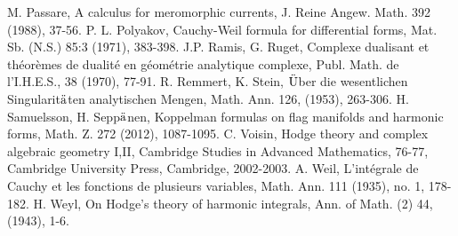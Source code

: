 \documentclass[11pt,reqno]{amsart}
\numberwithin{equation}{section}
\begin{document}
\begin{thebibliography}{WIDT}
 M. Passare, A calculus for meromorphic currents, J. Reine Angew. Math.
392 (1988), 37-56. 
 P. L. Polyakov, Cauchy-Weil formula for differential forms, Mat. Sb.
(N.S.) 85:3 (1971), 383-398.
 J.P. Ramis, G. Ruget, Complexe dualisant et th\'eor\`emes de dualit\'e
en g\'eom\'etrie analytique complexe, Publ. Math. de l'I.H.E.S., 38 (1970), 77-91.
 R. Remmert, K. Stein, $\ddot{\text U}$ber die wesentlichen
Singularit$\ddot{\text a}$ten analytischen Mengen, Math. Ann. 126, (1953), 263-306.
 H. Samuelsson, H. Sepp$\ddot{\text a}$nen, Koppelman formulas
on flag manifolds and harmonic forms, Math. Z. 272 (2012), 1087-1095.
 C. Voisin, Hodge theory and complex algebraic geometry I,II,
Cambridge Studies in Advanced Mathematics, 76-77, Cambridge University Press,
Cambridge, 2002-2003.
 A. Weil, L'int\'egrale de Cauchy et les fonctions de plusieurs variables,
Math. Ann. 111 (1935), no. 1, 178-182.
 H. Weyl, On Hodge's theory of harmonic integrals,
Ann. of Math. (2) 44, (1943), 1-6.
\end{thebibliography}
\end{document}
